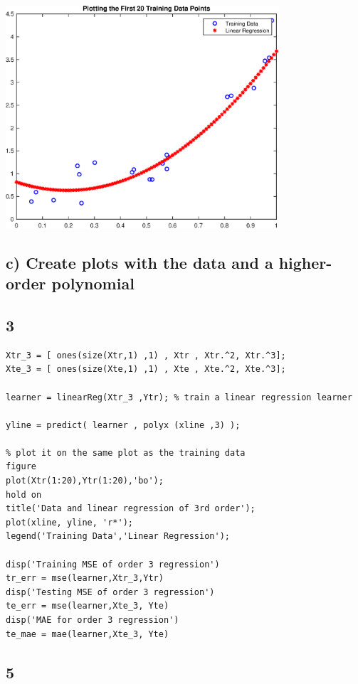\documentclass{article}
\begin{document}
\includegraphics [width=4in]{practice1_02.eps}


\subsection*{c) Create plots with the data and a higher-order polynomial}



\subsection*{3}

\begin{verbatim}
Xtr_3 = [ ones(size(Xtr,1) ,1) , Xtr , Xtr.^2, Xtr.^3];
Xte_3 = [ ones(size(Xte,1) ,1) , Xte , Xte.^2, Xte.^3];

learner = linearReg(Xtr_3 ,Ytr); % train a linear regression learner

yline = predict( learner , polyx (xline ,3) );

% plot it on the same plot as the training data
figure
plot(Xtr(1:20),Ytr(1:20),'bo');
hold on
title('Data and linear regression of 3rd order');
plot(xline, yline, 'r*');
legend('Training Data','Linear Regression');

disp('Training MSE of order 3 regression')
tr_err = mse(learner,Xtr_3,Ytr)
disp('Testing MSE of order 3 regression')
te_err = mse(learner,Xte_3, Yte)
disp('MAE for order 3 regression')
te_mae = mae(learner,Xte_3, Yte)
\end{verbatim}


\subsection*{5}
\end{document}
